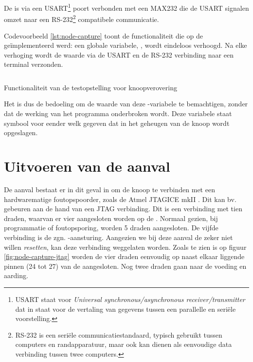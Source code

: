 De \mcu is via een USART\footnote{USART staat voor \emph{Universal
synchronous/asynchronous receiver/transmitter} dat in staat voor de vertaling
van gegevens tussen een parallelle en seri\"ele voorstelling.} poort verbonden
met een MAX232 \citep{datasheet:max232} die de USART signalen omzet naar een
RS-232\footnote{RS-232 is een seri\"ele communicatiestandaard, typisch gebruikt
tussen computers en randapparatuur, maar ook kan dienen als eenvoudige data
verbinding tussen twee computers.} compatibele communicatie.

Codevoorbeeld \ref{lst:node-capture} toont de functionaliteit die op de \mcu
ge\"implementeerd werd: een globale variabele, , wordt eindeloos
verhoogd. Na elke verhoging wordt de waarde via de USART en de RS-232
verbinding naar een terminal verzonden. 

\begin{listing}[ht]
  \inputminted[linenos,frame=lines,framesep=2mm,fontsize=\footnotesize]{c}{../src/node-capture/main.c}
  \vspace{-5mm}
  \caption{Functionaliteit van de testopstelling voor knoopverovering}
  \label{lst:node-capture}
\end{listing}

Het is dus de bedoeling om de waarde van deze -variabele te
bemachtigen, zonder dat de werking van het programma onderbroken wordt. Deze
variabele staat symbool voor eender welk gegeven dat in het geheugen van de
knoop wordt opgeslagen.

\vspace{-3mm}

\section{Uitvoeren van de aanval}

De aanval bestaat er in dit geval in om de knoop te verbinden met een
hardwarematige foutopspoorder, zoals de Atmel JTAGICE mkII
\citep{manual:jtagicemkii}. Dit kan bv. gebeuren aan de hand van een JTAG
verbinding. Dit is een verbinding met tien draden, waarvan er vier aangesloten
worden op de \mcu. Normaal gezien, bij programmatie of foutopsporing, worden 5
draden aangesloten. De vijfde verbinding is de zgn. -aansturing.
Aangezien we bij deze aanval de \mcu zeker niet willen \emph{resetten}, kan
deze verbinding weggelaten worden. Zoals te zien is op figuur
\ref{fig:node-capture-jtag} worden de vier draden eenvoudig op naast elkaar
liggende pinnen (24 tot 27) van de \mcu aangesloten. Nog twee draden gaan naar
de voeding en aarding.


